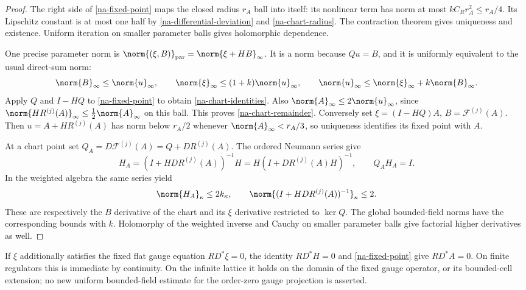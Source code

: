 \begin{proof}
The right side of \eqref{na-fixed-point} maps the closed radius
$r_A$ ball into itself: its nonlinear term has norm at most
$kC_Rr_A^2\le r_A/4$. Its Lipschitz constant is at most one half
by \eqref{na-differential-deviation} and \eqref{na-chart-radius}.
The contraction theorem gives uniqueness and existence. Uniform
iteration on smaller parameter balls gives holomorphic dependence.

One precise parameter norm is
$\norm{(\xi,B)}_{\mathrm{par}}=\norm{\xi+HB}_\infty$.
It is a norm because $Qu=B$, and it is uniformly equivalent to
the usual direct-sum norm:
\[
 \norm{B}_\infty\le\norm{u}_\infty,\qquad
 \norm{\xi}_\infty\le(1+k)\norm{u}_\infty,\qquad
 \norm{u}_\infty\le\norm{\xi}_\infty+k\norm{B}_\infty.
\]
Apply $Q$ and $I-HQ$ to \eqref{na-fixed-point} to obtain
\eqref{na-chart-identities}. Also
$\norm{A}_\infty\le2\norm{u}_\infty$, since
$\norm{HR^{(j)}(A)}_\infty\le\frac12\norm{A}_\infty$ on this
ball. This proves \eqref{na-chart-remainder}. Conversely set
$\xi=(I-HQ)A$, $B=\mathcal F^{(j)}(A)$. Then
$u=A+HR^{(j)}(A)$ has norm below $r_A/2$ whenever
$\norm{A}_\infty<r_A/3$, so uniqueness identifies its fixed point
with $A$.

At a chart point set
$Q_A=D\mathcal F^{(j)}(A)=Q+DR^{(j)}(A)$. The ordered Neumann
series give
\begin{equation}
 H_A=(I+H DR^{(j)}(A))^{-1}H
      =H(I+DR^{(j)}(A)H)^{-1},\qquad Q_AH_A=I.
 \label{na-chart-right-inverse}
\end{equation}
In the weighted algebra the same series yield
\begin{equation}
 \norm{H_A}_\kappa\le2k_\kappa,
 \qquad \norm{(I+H DR^{(j)}(A))^{-1}}_\kappa\le2.
 \label{na-chart-weighted}
\end{equation}
These are respectively the $B$ derivative of the chart and its
$\xi$ derivative restricted to $\ker Q$. The global bounded-field
norms have the corresponding bounds with $k$. Holomorphy of the
weighted inverse and Cauchy on smaller parameter balls give
factorial higher derivatives as well.
\end{proof}

If $\xi$ additionally satisfies the fixed flat gauge equation
$RD^*\xi=0$, the identity $RD^*H=0$ and
\eqref{na-fixed-point} give $RD^*A=0$. On finite regulators this
is immediate by continuity. On the infinite lattice it holds on the
domain of the fixed gauge operator, or its bounded-cell extension;
no new uniform bounded-field estimate for the order-zero gauge
projection is asserted.

